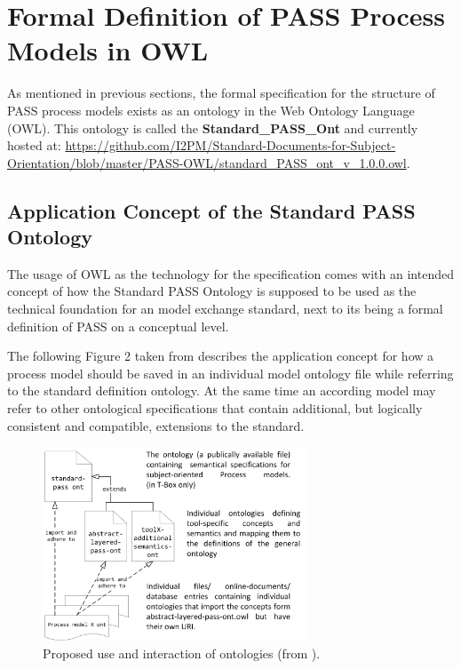 \section{Formal Definition of PASS Process Models in OWL}
\label{sec:formalModelStrucutreOWL}

As mentioned in previous sections, the formal specification for the structure of PASS process models exists as an ontology in the Web Ontology Language (OWL). This ontology is called the \textbf{Standard\_PASS\_Ont} and currently hosted at: 
\url{https://github.com/I2PM/Standard-Documents-for-Subject-Orientation/blob/master/PASS-OWL/standard_PASS\_ont\_v\_1.0.0.owl}.

\subsection{Application Concept of the Standard PASS Ontology}

The usage of OWL as the technology for the specification comes with an intended concept of how the Standard PASS Ontology is supposed to be used as the technical foundation for an model exchange standard, next to its being a formal definition of PASS on a conceptual level.

The following Figure 2 taken from \cite{elster:ont} describes the application concept for how a process model should be saved in an individual model ontology file while referring to the standard definition ontology. At the same time an according model may refer to other ontological specifications that contain additional, but logically consistent and compatible, extensions to the standard.


\begin{figure}[ht]
	\centering
	\includegraphics[width=0.7\textwidth]{Figures/Ontology/Introduction/ont-and-models.png}
	\caption{Proposed use and interaction of ontologies (from \cite{elster:ont} ).}
\end{figure}

